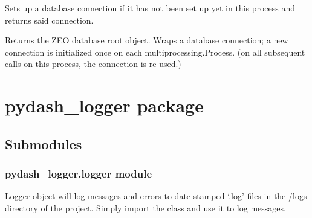 \documentclass[letterpaper,10pt,english]{sphinxmanual}
\begin{document}

\begin{fulllineitems}
\label{\detokenize{pydash_database:pydash_database.database_connection}}
Sets up a database connection if it has not been set up yet in this process and returns said connection.

\end{fulllineitems}


\begin{fulllineitems}
\label{\detokenize{pydash_database:pydash_database.database_root}}
Returns the ZEO database root object.
Wraps a database connection; a new connection is initialized once
on each multiprocessing.Process.
(on all subsequent calls on this process, the connection is re-used.)

\end{fulllineitems}



\section{pydash\_logger package}
\label{\detokenize{pydash_logger:module-pydash_logger}}\label{\detokenize{pydash_logger:pydash-logger-package}}\label{\detokenize{pydash_logger::doc}}

\subsection{Submodules}
\label{\detokenize{pydash_logger:submodules}}

\subsubsection{pydash\_logger.logger module}
\label{\detokenize{pydash_logger.logger:module-pydash_logger.logger}}\label{\detokenize{pydash_logger.logger:pydash-logger-logger-module}}\label{\detokenize{pydash_logger.logger::doc}}
Logger object will log messages and errors to date-stamped ‘.log’ files in the /logs directory of the project. Simply
import the class and use it to log messages.
\end{document}
